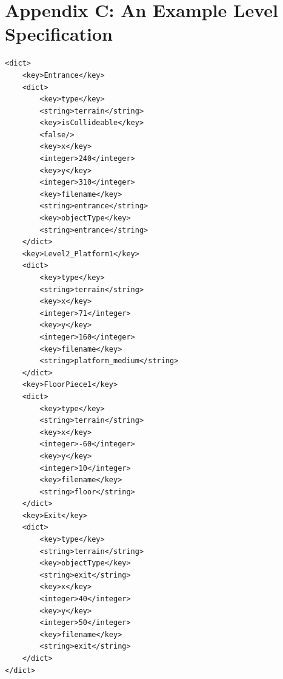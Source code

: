 \documentclass[a4paper,oneside]{report}
\begin{document}
\section{Appendix C: An Example Level Specification}
\begin{lstlisting}
<dict>
	<key>Entrance</key>
	<dict>
		<key>type</key>
		<string>terrain</string>
		<key>isCollideable</key>
		<false/>
		<key>x</key>
		<integer>240</integer>
		<key>y</key>
		<integer>310</integer>
		<key>filename</key>
		<string>entrance</string>
		<key>objectType</key>
		<string>entrance</string>
	</dict>
	<key>Level2_Platform1</key>
	<dict>
		<key>type</key>
		<string>terrain</string>
		<key>x</key>
		<integer>71</integer>
		<key>y</key>
		<integer>160</integer>
		<key>filename</key>
		<string>platform_medium</string>
	</dict>
	<key>FloorPiece1</key>
	<dict>
		<key>type</key>
		<string>terrain</string>
		<key>x</key>
		<integer>-60</integer>
		<key>y</key>
		<integer>10</integer>
		<key>filename</key>
		<string>floor</string>
	</dict>
	<key>Exit</key>
	<dict>
		<key>type</key>
		<string>terrain</string>
		<key>objectType</key>
		<string>exit</string>
		<key>x</key>
		<integer>40</integer>
		<key>y</key>
		<integer>50</integer>
		<key>filename</key>
		<string>exit</string>
	</dict>
</dict>
\end{lstlisting}
\newpage
\end{document}
